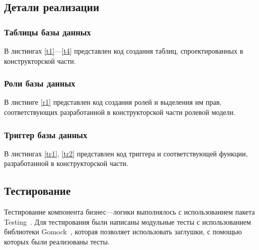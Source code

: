 \newpage
\subsection{Детали реализации}

\subsubsection{Таблицы базы данных}

В листингах \ref{t1}---\ref{t4} представлен код создания таблиц, спроектированных в конструкторской части.


\clearpage


\clearpage


\clearpage



\subsubsection{Роли базы данных}

В листинге \ref{r1} представлен код создания ролей и выделения им прав, соответствующих разработанной в конструкторской части ролевой модели.
\clearpage



\subsubsection{Триггер базы данных}

В листингах \ref{tr1}, \ref{tr2} представлен код триггера и соответствующей функции, разработанной в конструкторской части.


\clearpage




\subsection{Тестирование}

Тестирование компонента бизнес---логики выполнялось с использованием пакета Testing~\cite{testing}. Для тестирования были написаны модульные тесты с использованием библиотеки Gomock~\cite{gomock}, которая позволяет использовать заглушки, с помощью которых были реализованы тесты.

